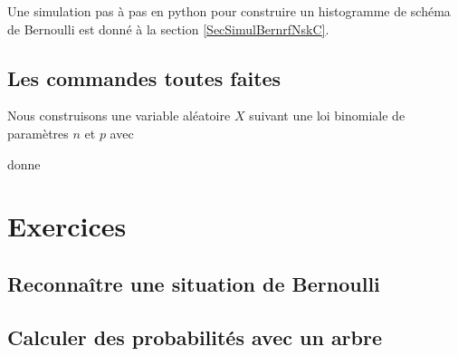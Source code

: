 Une simulation pas à pas en python pour construire un histogramme de schéma de Bernoulli est donné à la section \ref{SecSimulBernrfNskC}.

\subsection{Les commandes toutes faites}

Nous construisons une variable aléatoire \( X\) suivant une loi binomiale de paramètres \( n\) et \( p\) avec


donne


\section{Exercices }

\subsection{Reconnaître une situation de Bernoulli}


\subsection{Calculer des probabilités avec un arbre}


